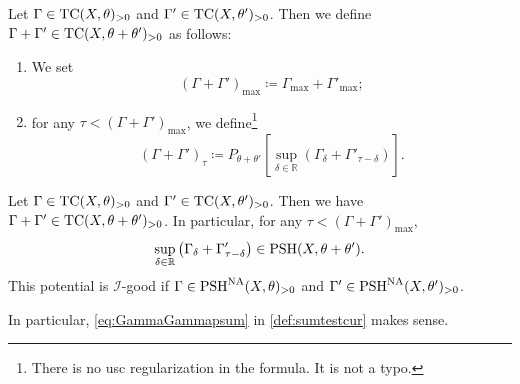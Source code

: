 \begin{definition}\label{def:sumtestcur}
    Let $\Gamma \in \mathrm{TC}(X,\theta)_{>0}$ and $\Gamma' \in \mathrm{TC}(X,\theta')_{>0}$. Then we define $\Gamma+\Gamma'\in \mathrm{TC}(X,\theta+\theta')_{>0}$ as follows:
    \begin{enumerate}
        \item\label{itm:def:sumtestcur:1} We set
        \[
        (\Gamma+\Gamma')_{\max}\coloneqq \Gamma_{\max}+\Gamma'_{\max};
        \]
        \item\label{itm:def:sumtestcur:2} for any $\tau<(\Gamma+\Gamma')_{\max}$, we define\footnote{There is no usc regularization in the formula. It is not a typo.}
        \begin{equation}\label{eq:GammaGammapsum}
            (\Gamma+\Gamma')_{\tau }\coloneqq P_{\theta+\theta'}\left[\sup_{\delta\in \mathbb{R}} \left(\Gamma_\delta+\Gamma'_{\tau-\delta}\right)\right].
        \end{equation}
    \end{enumerate}
\end{definition}




\begin{lemma}\label{lma:testcurvplus}
    Let $\Gamma \in \mathrm{TC}(X,\theta)_{>0}$ and $\Gamma' \in \mathrm{TC}(X,\theta')_{>0}$. Then we have $\Gamma+\Gamma'\in \mathrm{TC}(X,\theta+\theta')_{>0}$. In particular, for any $\tau<(\Gamma+\Gamma')_{\max}$,
    \[
    \sup_{\delta\in \mathbb{R}} \left(\Gamma_\delta+\Gamma'_{\tau-\delta}\right)\in \mathrm{PSH}(X,\theta+\theta').
    \]
    This potential is $\mathcal{I}$-good if $\Gamma \in \mathrm{PSH}^{\mathrm{NA}}(X,\theta)_{>0}$ and $\Gamma' \in \mathrm{PSH}^{\mathrm{NA}}(X,\theta')_{>0}$.

    In particular, \eqref{eq:GammaGammapsum} in \cref{def:sumtestcur} makes sense.
\end{lemma}

